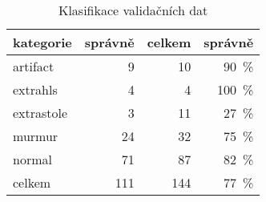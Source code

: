 \documentclass[\languages,a4paper,12pt]{article}
\begin{document}
\begin{table}[htbp]
\centering
\begin{tabular}{ l r r r }
	kategorie   &    správně  &     celkem  &             správně  \\
	\hline
	artifact    &  \num{  9}  &  \num{ 10}  &  \SI{ 90}{\percent}  \\
	extrahls    &  \num{  4}  &  \num{  4}  &  \SI{100}{\percent}  \\
	extrastole  &  \num{  3}  &  \num{ 11}  &  \SI{ 27}{\percent}  \\
	murmur      &  \num{ 24}  &  \num{ 32}  &  \SI{ 75}{\percent}  \\
	normal      &  \num{ 71}  &  \num{ 87}  &  \SI{ 82}{\percent}  \\
	\hline
	celkem      &  \num{111}  &  \num{144}  &  \SI{ 77}{\percent}  \\
\end{tabular}
\caption{Klasifikace validačních dat}
\end{table}
\end{document}
